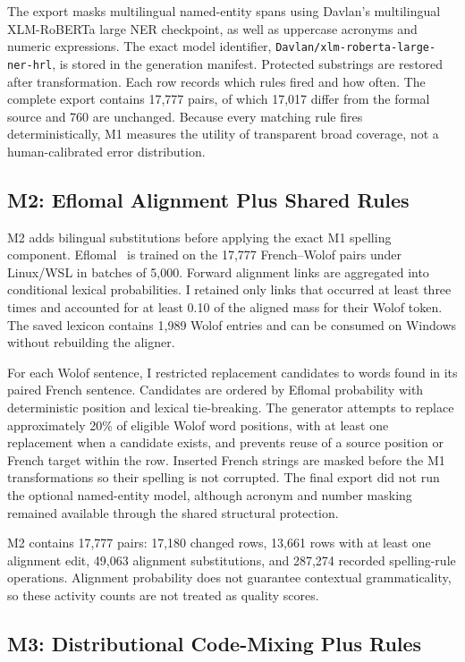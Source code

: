 \documentclass[12pt, a4paper, twoside, openany]{report}
\begin{document}
The export masks multilingual named-entity spans using Davlan's multilingual XLM-RoBERTa large NER checkpoint, as well as uppercase acronyms and numeric expressions. The exact model identifier, \texttt{Davlan/xlm-roberta-large-ner-hrl}, is stored in the generation manifest. Protected substrings are restored after transformation. Each row records which rules fired and how often. The complete export contains 17,777 pairs, of which 17,017 differ from the formal source and 760 are unchanged. Because every matching rule fires deterministically, M1 measures the utility of transparent broad coverage, not a human-calibrated error distribution.


\subsection{M2: Eflomal Alignment Plus Shared Rules}

M2 adds bilingual substitutions before applying the exact M1 spelling component. Eflomal~\cite{ostling2016alignment} is trained on the 17,777 French--Wolof pairs under Linux/WSL in batches of 5,000. Forward alignment links are aggregated into conditional lexical probabilities. I retained only links that occurred at least three times and accounted for at least 0.10 of the aligned mass for their Wolof token. The saved lexicon contains 1,989 Wolof entries and can be consumed on Windows without rebuilding the aligner.

For each Wolof sentence, I restricted replacement candidates to words found in its paired French sentence. Candidates are ordered by Eflomal probability with deterministic position and lexical tie-breaking. The generator attempts to replace approximately 20\% of eligible Wolof word positions, with at least one replacement when a candidate exists, and prevents reuse of a source position or French target within the row. Inserted French strings are masked before the M1 transformations so their spelling is not corrupted. The final export did not run the optional named-entity model, although acronym and number masking remained available through the shared structural protection.

M2 contains 17,777 pairs: 17,180 changed rows, 13,661 rows with at least one alignment edit, 49,063 alignment substitutions, and 287,274 recorded spelling-rule operations. Alignment probability does not guarantee contextual grammaticality, so these activity counts are not treated as quality scores.


\subsection{M3: Distributional Code-Mixing Plus Rules}
\end{document}
